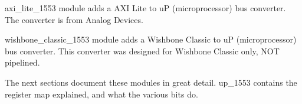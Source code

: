 \par
axi\_lite\_1553 module adds a AXI Lite to uP (microprocessor) bus converter. The converter is
from Analog Devices.

\par
wishbone\_classic\_1553 module adds a Wishbone Classic to uP (microprocessor) bus converter. This
converter was designed for Wishbone Classic only, NOT pipelined.

\vspace{15mm}
\par
The next sections document these modules in great detail. up\_1553 contains the register map explained, and what the various bits do.


